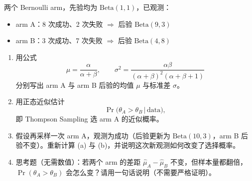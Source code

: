 \documentclass[12pt, a4paper]{ctexart}
\begin{document}
\begin{problem}
两个 Bernoulli arm，先验均为 $\mathrm{Beta}(1, 1)$，已观测：
\begin{itemize}
    \item arm A：8 次成功、2 次失败 \;$\Rightarrow$\; 后验 $\mathrm{Beta}(9, 3)$
    \item arm B：3 次成功、7 次失败 \;$\Rightarrow$\; 后验 $\mathrm{Beta}(4, 8)$
\end{itemize}

\begin{enumerate}[label=(\alph*)]
    \item 用公式
    \[
    \mu = \frac{\alpha}{\alpha + \beta}, \qquad \sigma^2 = \frac{\alpha \beta}{(\alpha + \beta)^2 (\alpha + \beta + 1)}
    \]
    分别写出 arm A 与 arm B 后验的均值 $\mu$ 与标准差 $\sigma$。

    \item 用正态近似估计
    \[
    \Pr\!\big(\theta_A > \theta_B \,\big|\, \text{data}\big),
    \]
    即 Thompson Sampling 选 arm A 的近似概率。

    \item 假设再采样一次 arm A，观测为成功（后验更新为 $\mathrm{Beta}(10, 3)$，arm B 后验不变）。重新计算 (a) 与 (b)，并说明这次新观测如何改变了选择概率。

    \item 思考题（无需数值）：若两个 arm 的差距 $\hat{\mu}_A - \hat{\mu}_B$ 不变，但样本量都翻倍，$\Pr(\theta_A > \theta_B)$ 会怎么变？请用一句话说明（不需要严格证明）。
\end{enumerate}
\end{problem}
\end{document}
